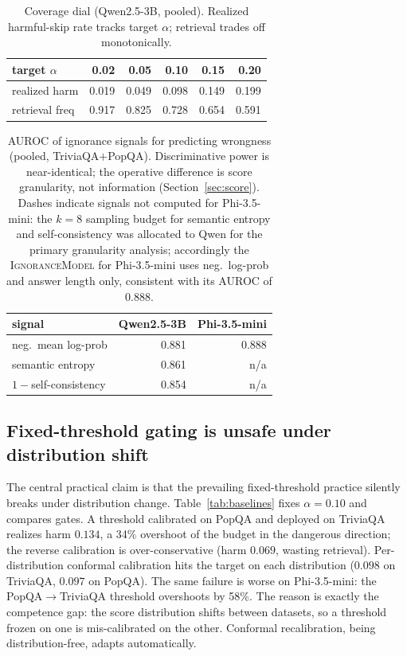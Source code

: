 \documentclass[a4paper,fleqn]{cas-dc}
\begin{document}
\begin{table}[width=\textwidth,cols=6,pos=h]
\caption{Coverage dial (Qwen2.5-3B, pooled). Realized harmful-skip rate tracks
target $\alpha$; retrieval trades off monotonically.}\label{tab:dial}
\begin{tabular*}{\tblwidth}{@{} lRRRRR @{}}
\toprule
target $\alpha$ & 0.02 & 0.05 & 0.10 & 0.15 & 0.20\\
\midrule
realized harm & 0.019 & 0.049 & 0.098 & 0.149 & 0.199\\
retrieval freq & 0.917 & 0.825 & 0.728 & 0.654 & 0.591\\
\bottomrule
\end{tabular*}
\end{table}

\begin{table}[width=.9\linewidth,cols=3,pos=h]
\caption{AUROC of ignorance signals for predicting wrongness (pooled,
TriviaQA$+$PopQA). Discriminative power is near-identical; the operative
difference is score granularity, not information
(Section~\ref{sec:score}). Dashes indicate signals not computed for
Phi-3.5-mini: the $k=8$ sampling budget for semantic entropy and
self-consistency was allocated to Qwen for the primary granularity
analysis; accordingly the \textsc{IgnoranceModel} for Phi-3.5-mini uses
neg.\ log-prob and answer length only, consistent with its AUROC of
$0.888$.}\label{tab:auroc}
\begin{tabular*}{\tblwidth}{@{} LRR @{}}
\toprule
signal & Qwen2.5-3B & Phi-3.5-mini\\
\midrule
neg.\ mean log-prob & 0.881 & 0.888\\
semantic entropy & 0.861 & n/a\\
$1-$self-consistency & 0.854 & n/a\\
\bottomrule
\end{tabular*}
\end{table}

\subsection{Fixed-threshold gating is unsafe under distribution shift}\label{sec:baselines}

The central practical claim is that the prevailing fixed-threshold practice
silently breaks under distribution change. Table~\ref{tab:baselines} fixes
$\alpha=0.10$ and compares gates. A threshold calibrated on PopQA and deployed on
TriviaQA realizes harm $0.134$, a 34\% overshoot of the budget in the dangerous
direction; the reverse calibration is over-conservative (harm $0.069$, wasting
retrieval). Per-distribution conformal calibration hits the target on each
distribution ($0.098$ on TriviaQA, $0.097$ on PopQA). The same failure is
worse on Phi-3.5-mini: the PopQA$\to$TriviaQA threshold overshoots by
58\%. The reason is exactly the competence gap: the score distribution shifts
between datasets, so a threshold frozen on one is mis-calibrated on the other.
Conformal recalibration, being distribution-free, adapts automatically.
\end{document}
